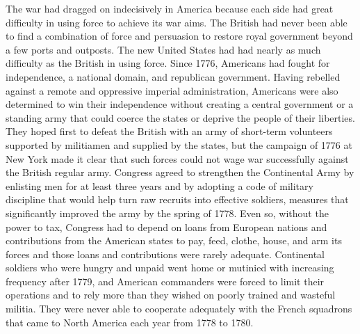 The war had dragged on indecisively in America because each side had great
difficulty in using force to achieve its war aims. The British had never been
able to find a combination of force and persuasion to restore royal government
beyond a few ports and outposts. The new United States had had nearly as much
difficulty as the British in using force. Since 1776, Americans had fought for
independence, a national domain, and republican government.  Having rebelled
against a remote and oppressive imperial administration, Americans were also
determined to win their independence without creating a central government or a
standing army that could coerce the states or deprive the people of their
liberties.  They hoped first to defeat the British with an army of short-term
volunteers supported by militiamen and supplied by the states, but the campaign
of 1776 at New York made it clear that such forces could not wage war
successfully against the British regular army. Congress agreed to strengthen
the Continental Army by enlisting men for at least three years and by adopting
a code of military discipline that would help turn raw recruits into effective
soldiers, measures that significantly improved the army by the spring of 1778. Even so,
without the power to tax, Congress had to depend on loans from European nations and
contributions from the American states to pay, feed, clothe, house, and arm its forces and
those loans and contributions were rarely adequate. Continental soldiers who were hungry
and unpaid went home or mutinied with increasing frequency after 1779, and American
commanders were forced to limit their operations and to rely more than they wished on
poorly trained and wasteful militia. They were never able to cooperate adequately with the
French squadrons that came to North America each year from 1778 to 1780.

